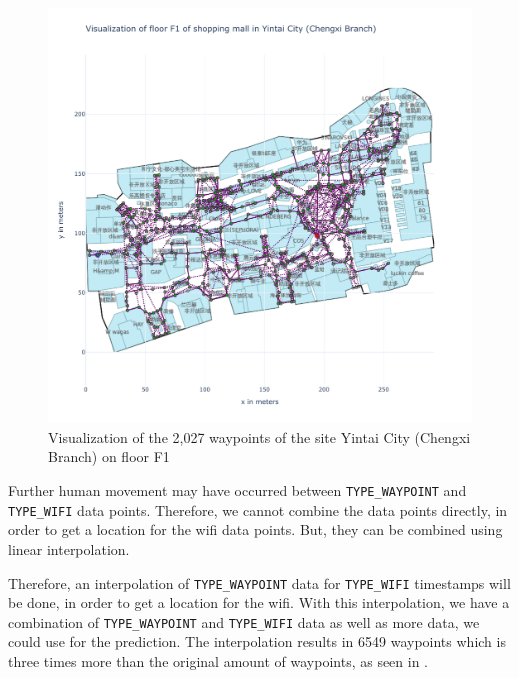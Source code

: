 \begin{figure}[h!]
    \centering
    \includegraphics[scale=0.375]{images/whole_floor_visualization_wo_interpolated.pdf}
    \caption{Visualization of the 2,027 waypoints of the site Yintai City (Chengxi Branch) on floor F1}
    \label{fig:vis-wo-interpolated}
\end{figure}

Further human movement may have occurred between \texttt{TYPE\_WAYPOINT} and \texttt{TYPE\_WIFI} data points.
Therefore, we cannot combine the data points directly, in order to get a location for the \ac{wifi} data points.
But, they can be combined using linear interpolation.%

%     

Therefore, an interpolation of \texttt{TYPE\_WAYPOINT} data for \texttt{TYPE\_WIFI} timestamps will be done, in order to get a location for the \ac{wifi}.
With this interpolation, we have a combination of \texttt{TYPE\_WAYPOINT} and \texttt{TYPE\_WIFI} data as well as more data, we could use for the prediction.
The interpolation results in 6549 waypoints which is three times more than the original amount of waypoints, as seen in .

